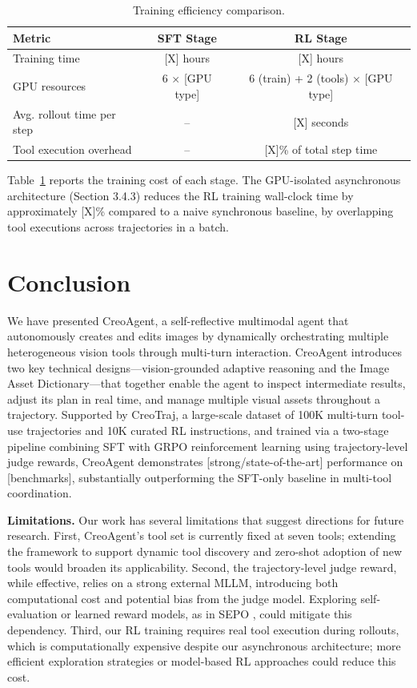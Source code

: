 \documentclass{article}
\begin{document}
\begin{table}[t]
\centering
\caption{Training efficiency comparison.}
\label{tab:efficiency}
\begin{tabular}{lcc}
\toprule
\textbf{Metric} & \textbf{SFT Stage} & \textbf{RL Stage} \\
\midrule
Training time & [X] hours & [X] hours \\
GPU resources & 6 $\times$ [GPU type] & 6 (train) + 2 (tools) $\times$ [GPU type] \\
Avg. rollout time per step & -- & [X] seconds \\
Tool execution overhead & -- & [X]\% of total step time \\
\bottomrule
\end{tabular}
\end{table}



Table~\ref{tab:efficiency} reports the training cost of each stage. The GPU-isolated asynchronous architecture (Section 3.4.3) reduces the RL training wall-clock time by approximately [X]\% compared to a naive synchronous baseline, by overlapping tool executions across trajectories in a batch.


\section{Conclusion}

We have presented CreoAgent, a self-reflective multimodal agent that autonomously creates and edits images by dynamically orchestrating multiple heterogeneous vision tools through multi-turn interaction. CreoAgent introduces two key technical designs—vision-grounded adaptive reasoning and the Image Asset Dictionary—that together enable the agent to inspect intermediate results, adjust its plan in real time, and manage multiple visual assets throughout a trajectory. Supported by CreoTraj, a large-scale dataset of 100K multi-turn tool-use trajectories and 10K curated RL instructions, and trained via a two-stage pipeline combining SFT with GRPO reinforcement learning using trajectory-level judge rewards, CreoAgent demonstrates [strong/state-of-the-art] performance on [benchmarks], substantially outperforming the SFT-only baseline in multi-tool coordination.

\textbf{Limitations.} Our work has several limitations that suggest directions for future research. First, CreoAgent's tool set is currently fixed at seven tools; extending the framework to support dynamic tool discovery and zero-shot adoption of new tools would broaden its applicability. Second, the trajectory-level judge reward, while effective, relies on a strong external MLLM, introducing both computational cost and potential bias from the judge model. Exploring self-evaluation or learned reward models, as in SEPO \cite{lin2025jarvisevo}, could mitigate this dependency. Third, our RL training requires real tool execution during rollouts, which is computationally expensive despite our asynchronous architecture; more efficient exploration strategies or model-based RL approaches could reduce this cost.
\end{document}

